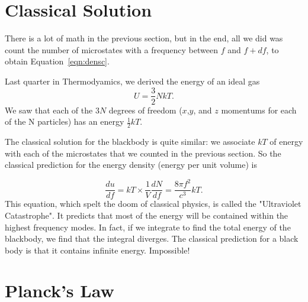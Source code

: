 \documentclass[12pt]{article}
\begin{document}

\section{Classical Solution}

There is a lot of math in the previous section, but in the end, all we did was count the number of microstates with a frequency between $f$ and $f+df$, to obtain Equation~\ref{eqn:densc}.

Last quarter in Thermodyamics, we derived the energy of an ideal gas
\begin{displaymath}
U = \frac{3}{2} N kT.
\end{displaymath}
We saw that each of the $3N$ degrees of freedom ($x$,$y$, and $z$ momentums for each of the N particles) has an energy $\frac{1}{2}kT$.

The classical solution for the blackbody is quite similar:  we associate $kT$ of energy with each of the microstates that we counted in the previous section.  So the classical prediction for the energy density (energy per unit volume) is

\begin{displaymath}
\frac{du}{df} = kT \times \frac{1}{V} \frac{dN}{df} = \frac{8 \pi f^2}{c^3} kT.
\end{displaymath}
This equation, which spelt the doom of classical physics, is called the "Ultraviolet Catastrophe".  It predicts that most of the energy will be contained within the highest frequency modes.  In fact, if we integrate to find the total energy of the blackbody, we find that the integral diverges.  The classical prediction for a black body is that it contains infinite energy.  Impossible!
 
\section{Planck's Law}
\end{document}
